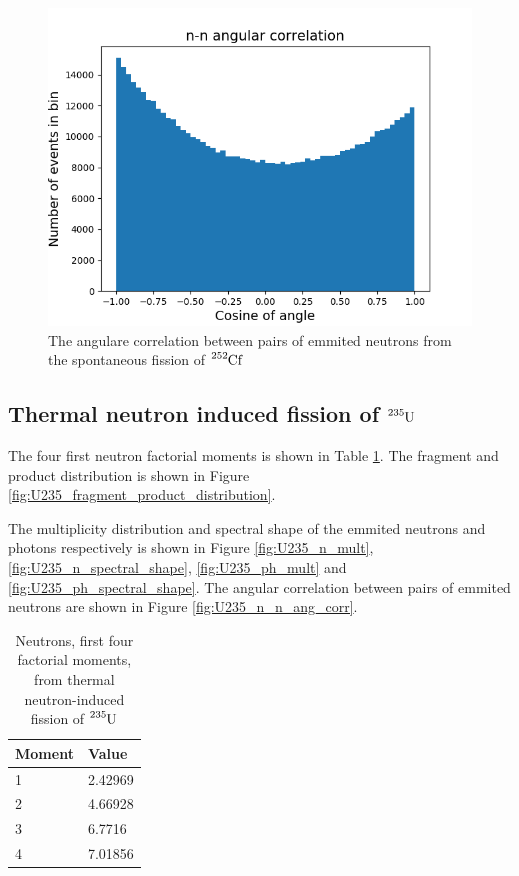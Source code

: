 \documentclass[]{article}
\begin{document}
\begin{figure} [H]
	\centering
	\includegraphics[scale=0.7]{Cf252_sf_n_n_ang_corr.png}
	\caption{The angulare correlation between pairs of emmited neutrons from the spontaneous fission of $\ce{^{252}Cf}$}
	\label{fig:Cf252_sf_n_n_ang_corr}
\end{figure}
	
\subsection{Thermal neutron induced fission of $\ce{^{235}U}$}

The four first neutron factorial moments is shown in Table \ref{tab:U235_n_moments}. The fragment and product distribution is shown in Figure \ref{fig:U235_fragment_product_distribution}. 

The multiplicity distribution and spectral shape of the emmited neutrons and photons respectively is shown in Figure \ref{fig:U235_n_mult}, \ref{fig:U235_n_spectral_shape}, \ref{fig:U235_ph_mult} and \ref{fig:U235_ph_spectral_shape}. The angular correlation between pairs of emmited neutrons are shown in Figure \ref{fig:U235_n_n_ang_corr}.

\begin{table} [H]
	\centering
	\caption{Neutrons, first four factorial moments, from thermal neutron-induced fission of $\ce{^{235}U}$ }
	\begin{tabularx}{\textwidth}{XX} \hline
		\label{tab:U235_n_moments}
		Moment & Value \\ \hline
		1 & 2.42969 \\
		2 & 4.66928\\
		3 & 6.7716\\
		4 & 7.01856\\ 
	\end{tabularx}
\end{table}
\end{document}
